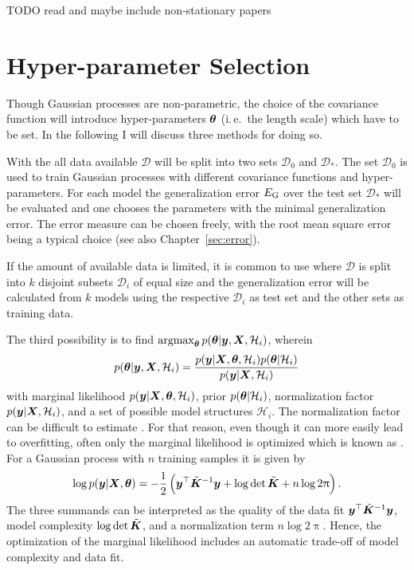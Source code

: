 TODO read and maybe include non-stationary papers

\section{Hyper-parameter Selection}
Though Gaussian processes are non-parametric, the choice of the covariance 
function will introduce hyper-parameters $\bm{\theta}$ (i.\,e.~the length scale) 
which have to be set.  In the following I will discuss three methods for doing 
so.

With the  all data available $\mathcal{D}$ will be 
split into two sets $\mathcal{D}_0$ and $\mathcal{D}_*$. The set $\mathcal{D}_0$ 
is used to train Gaussian processes with different covariance functions and 
hyper-parameters. For each model the generalization error $E_{\mathrm{G}}$ over the 
test set $\mathcal{D}_*$ will be evaluated and one chooses the parameters with 
the minimal generalization error. The error measure can be chosen freely, with 
the root mean square error being a typical choice (see also 
Chapter~\ref{sec:error}).

If the amount of available data is limited, it is common to use 
 where $\mathcal{D}$ is split into $k$ 
disjoint subsets $\mathcal{D}_i$ of equal size and the generalization error will 
be calculated from $k$ models using the respective $\mathcal{D}_i$ as test set 
and the other sets as training data.

The third possibility is to find $\operatorname*{argmax}_{\bm{\theta}} p(\bm{\theta} | \bm{y}, \bm{X}, \mathcal{H}_i)$, wherein
\begin{equation}
    p(\bm{\theta} | \bm{y}, \bm{X}, \mathcal{H}_i) = \frac{p(\bm{y} | \bm{X}, 
        \bm{\theta}, \mathcal{H}_i) p(\bm{\theta} | \mathcal{H}_i)}{p(\bm{y} | \bm{X}, \mathcal{H}_i)}
\end{equation}
with marginal likelihood $p(\bm{y} | \bm{X}, \bm{\theta}, \mathcal{H}_i)$, prior 
$p(\bm{\theta} | \mathcal{H}_i)$, normalization factor $p(\bm{y} | \bm{X}, 
\mathcal{H}_i)$, and a set of possible model structures $\mathcal{H}_i$. The 
normalization factor can be difficult to estimate 
\parencite[109]{Rasmussen:2006vz}. For that reason, even though it can more 
easily lead to overfitting, often only the marginal likelihood is optimized 
which is known as . For a Gaussian 
process with $n$ training samples it is given by
\begin{equation}
    \log p(\vc y | \mat X, \vc\theta) = -\frac{1}{2}\del{\vc y\Tr 
        \tilde{\mat{K}}^{-1} \vc y + \log \det \tilde{\mat K} + n \log 2\uppi} 
    \text{.}
\end{equation}
The three summands can be interpreted as the quality of the data fit $\bm{y}^{\top} 
\tilde{\bm{K}}^{-1} \bm{y}$, model complexity $\log \det \tilde{\bm{K}}$, and 
a normalization term $n \log 2\uppi$. Hence, the optimization of the marginal 
likelihood includes an automatic trade-off of model complexity and data fit.

